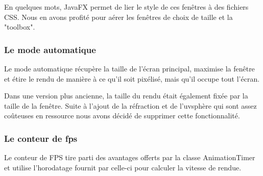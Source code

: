 En quelques mots, JavaFX permet de lier le style de ces fenêtres à des fichiers CSS. Nous en avons profité pour aérer les fenêtres de choix de taille et la "toolbox".

\subsubsection{Le mode automatique}

Le mode automatique récupère la taille de l'écran principal, maximise la fenêtre et étire le rendu de manière à ce qu'il soit pixélisé, mais qu'il occupe tout l'écran.

Dans une version plus ancienne, la taille du rendu était également fixée par la taille de la fenêtre. Suite à l'ajout de la réfraction et de l'uvsphère qui sont assez coûteuses en ressource nous avons décidé de supprimer cette fonctionnalité.

\subsubsection{Le conteur de fps}

Le conteur de FPS tire parti des avantages offerts par la classe AnimationTimer et utilise l'horodatage fournit par celle-ci pour calculer la vitesse de rendue.
